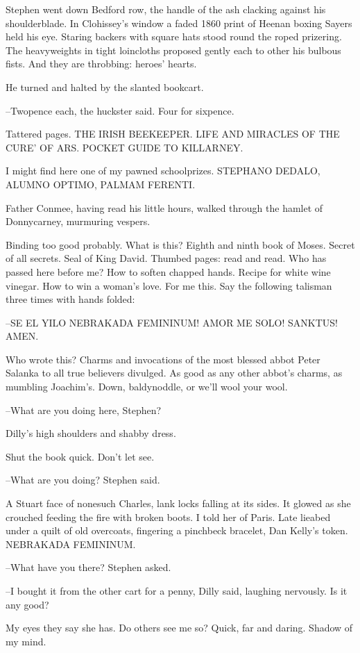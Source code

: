 Stephen went down Bedford row, the handle of the ash clacking against his
shoulderblade. In Clohissey's window a faded 1860 print of Heenan boxing
Sayers held his eye. Staring backers with square hats stood round the
roped prizering. The heavyweights in tight loincloths proposed gently
each to other his bulbous fists. And they are throbbing: heroes' hearts.

He turned and halted by the slanted bookcart.

--Twopence each, the huckster said. Four for sixpence.

Tattered pages. THE IRISH BEEKEEPER. LIFE AND MIRACLES OF THE CURE' OF
ARS. POCKET GUIDE TO KILLARNEY.

I might find here one of my pawned schoolprizes. STEPHANO DEDALO, ALUMNO
OPTIMO, PALMAM FERENTI.

Father Conmee, having read his little hours, walked through the hamlet of
Donnycarney, murmuring vespers.

Binding too good probably. What is this? Eighth and ninth book of Moses.
Secret of all secrets. Seal of King David. Thumbed pages: read and read.
Who has passed here before me? How to soften chapped hands. Recipe for
white wine vinegar. How to win a woman's love. For me this. Say the
following talisman three times with hands folded:

--SE EL YILO NEBRAKADA FEMININUM! AMOR ME SOLO! SANKTUS! AMEN.

Who wrote this? Charms and invocations of the most blessed abbot Peter
Salanka to all true believers divulged. As good as any other abbot's
charms, as mumbling Joachim's. Down, baldynoddle, or we'll wool your
wool.

--What are you doing here, Stephen?

Dilly's high shoulders and shabby dress.

Shut the book quick. Don't let see.

--What are you doing? Stephen said.

A Stuart face of nonesuch Charles, lank locks falling at its sides. It
glowed as she crouched feeding the fire with broken boots. I told her of
Paris. Late lieabed under a quilt of old overcoats, fingering a pinchbeck
bracelet, Dan Kelly's token. NEBRAKADA FEMININUM.

--What have you there? Stephen asked.

--I bought it from the other cart for a penny, Dilly said, laughing
nervously. Is it any good?

My eyes they say she has. Do others see me so? Quick, far and daring.
Shadow of my mind.

